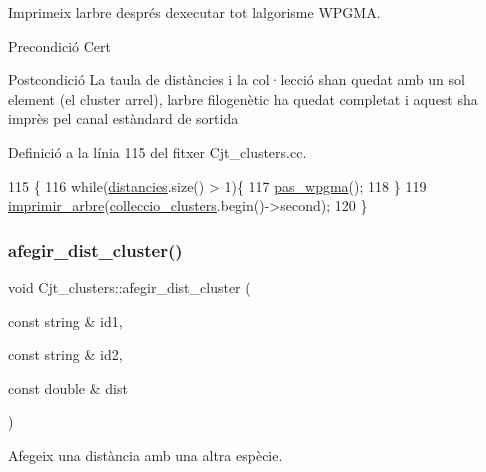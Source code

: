 Imprimeix l\textquotesingle{}arbre després d\textquotesingle{}executar tot l\textquotesingle{}algorisme W\+P\+G\+MA. 

\begin{DoxyPrecond}{Precondició}
Cert 
\end{DoxyPrecond}
\begin{DoxyPostcond}{Postcondició}
La taula de distàncies i la col·lecció s\textquotesingle{}han quedat amb un sol element (el cluster arrel), l\textquotesingle{}arbre filogenètic ha quedat completat i aquest s\textquotesingle{}ha imprès pel canal estàndard de sortida 
\end{DoxyPostcond}


Definició a la línia 115 del fitxer Cjt\+\_\+clusters.\+cc.


\begin{DoxyCode}
115                                               \{
116     \textcolor{keywordflow}{while}(\hyperlink{class_cjt__clusters_a8e94e53830e3224d791dcf7dbd0a6082}{distancies}.size() > 1)\{
117         \hyperlink{class_cjt__clusters_a0675e6339f6a8fad8219518c377fbcf9}{pas\_wpgma}();
118     \}
119     \hyperlink{_cjt__clusters_8cc_ac7539e7b223cc6042be093b32ac8b016}{imprimir\_arbre}(\hyperlink{class_cjt__clusters_aea7d6362517dd16cbd12736a3da50021}{colleccio\_clusters}.begin()->second);
120 \}
\end{DoxyCode}
\mbox{\label{class_cjt__clusters_a928bbb5f0ee0756d291ad28e453892bb}} 
\subsubsection{\texorpdfstring{afegir\+\_\+dist\+\_\+cluster()}{afegir\_dist\_cluster()}}
{\footnotesize\ttfamily void Cjt\+\_\+clusters\+::afegir\+\_\+dist\+\_\+cluster (\begin{DoxyParamCaption}\item[{const string \&}]{id1,  }\item[{const string \&}]{id2,  }\item[{const double \&}]{dist }\end{DoxyParamCaption})}



Afegeix una distància amb una altra espècie. 

